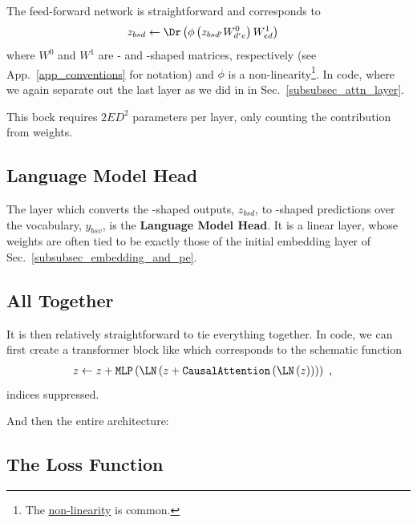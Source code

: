 \documentclass[11pt]{article}
\begin{document}
The feed-forward network is straightforward and corresponds to
\begin{align}
	z _{ bsd } & \leftarrow \Dr \left (\phi \left ( z _{ bsd' }W ^{ 0 }_{ d'e } \right ) W ^{ 1 } _{ ed
	} \right ) \label{eq_mlp}
\end{align}
where $ W ^{ 0 } $ and $ W ^{ 1 } $ are - and -shaped matrices,
respectively (see App.~\ref{app_conventions} for notation) and $ \phi $ is a
non-linearity\footnote{The 
	\href{https://pytorch.org/docs/stable/generated/torch.nn.GELU.html}{non-linearity} is common.}.
In code, where we again separate out the last  layer as we did in in
Sec.~\ref{subsubsec_attn_layer}.  

This bock requires $ 2 E D ^{ 2 } $ parameters per layer, only counting the contribution from
weights.


\subsection{Language Model Head \label{subsubsec_language_model_head} }


The layer which converts the -shaped outputs, $ z _{ bsd } $, to -shaped
predictions over the vocabulary, $  y _{ bsv } $, is the \textbf{Language Model Head}. It
is a linear layer, whose weights are often tied to be exactly those of the initial embedding
layer of Sec.~\ref{subsubsec_embedding_and_pe}.


\subsection{All Together}
It is then relatively straightforward to tie everything together.  In code, we can first create a
transformer block like
which corresponds to the schematic function
\begin{align}
	z & \leftarrow  z + \texttt{MLP}\left ( \LN \left ( z + \texttt{CausalAttention}\left ( \LN \left (
				z\right ) \right )  \right ) \right )\ ,
\end{align}
indices suppressed.

And then the entire architecture: 


\subsection{The Loss Function}
\end{document}

